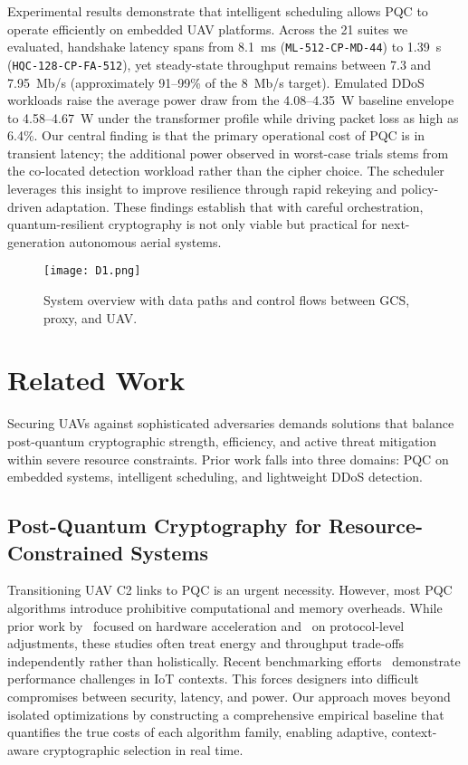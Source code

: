 \documentclass[sigconf,natbib=false]{acmart}
\begin{document}
Experimental results demonstrate that intelligent scheduling allows PQC to operate efficiently on embedded UAV platforms. Across the 21 suites we evaluated, handshake latency spans from 8.1~ms (\texttt{ML-512-CP-MD-44}) to 1.39~s (\texttt{HQC-128-CP-FA-512}), yet steady-state throughput remains between 7.3 and 7.95~Mb/s (approximately 91--99\% of the 8~Mb/s target). Emulated DDoS workloads raise the average power draw from the 4.08--4.35~W baseline envelope to 4.58--4.67~W under the transformer profile while driving packet loss as high as 6.4\%. Our central finding is that the primary operational cost of PQC is in transient latency; the additional power observed in worst-case trials stems from the co-located detection workload rather than the cipher choice. The scheduler leverages this insight to improve resilience through rapid rekeying and policy-driven adaptation. These findings establish that with careful orchestration, quantum-resilient cryptography is not only viable but practical for next-generation autonomous aerial systems.

\begin{figure}[h]
  \centering
  \texttt{[image: D1.png]}
  \caption{System overview with data paths and control flows between GCS, proxy, and UAV.}
  \label{fig:system_overview}
\end{figure}


\section{Related Work}

Securing UAVs against sophisticated adversaries demands solutions that balance post-quantum cryptographic strength, efficiency, and active threat mitigation within severe resource constraints. Prior work falls into three domains: PQC on embedded systems, intelligent scheduling, and lightweight DDoS detection.

\subsection{Post-Quantum Cryptography for Resource-Constrained Systems}

Transitioning UAV C2 links to PQC is an urgent necessity. However, most PQC algorithms introduce prohibitive computational and memory overheads. While prior work by~\cite{dilithium_cortexm_tches2021} focused on hardware acceleration and~\cite{pqm4_2019,faster_kyber_dilithium_m4_2022} on protocol-level adjustments, these studies often treat energy and throughput trade-offs independently rather than holistically. Recent benchmarking efforts~\cite{iot_pqtls_2023} demonstrate performance challenges in IoT contexts. This forces designers into difficult compromises between security, latency, and power. Our approach moves beyond isolated optimizations by constructing a comprehensive empirical baseline that quantifies the true costs of each algorithm family, enabling adaptive, context-aware cryptographic selection in real time.
\end{document}
